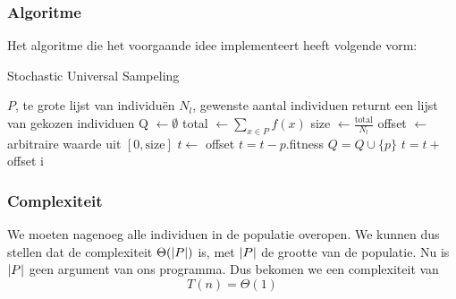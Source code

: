 \subsubsection{Algoritme}
Het algoritme die het voorgaande idee implementeert heeft volgende vorm:
	\begin{algorithm}[H]
	 	\caption{Stochastic Universal Sampeling}
		\begin{algorithmic}
		\Require 
			\State $P$, te grote lijst van individuën 
			\State $N_l$, gewenste aantal individuen
		\Ensure returnt een lijst van gekozen individuen
		\State Q $\gets \emptyset$
		\State total $\gets \sum_{x \in P} f(x)$ 
		\State size $\gets \frac{\text{total}}{N_l}$
		\State offset $\gets$ arbitraire waarde uit $\left\lbrack 0,\text{size} \right\rbrack$
		\State $t \gets$ offset
		\State $t = t-p.$fitness
			\State $Q = Q \cup \lbrace p \rbrace$
			\State $t = t+$offset
		\EndIf
		\EndFor		
		\State \Return i
		\EndFunction

		
		\end{algorithmic}
		\label{alg:SUS}
	\end{algorithm}		

\subsubsection{Complexiteit}
\label{ssub:SUSComplexity}
We moeten nagenoeg alle individuen in de populatie overopen. We kunnen dus stellen dat de complexiteit $ \Theta(\lvert P \rvert)$ is, met $\lvert P \rvert$ de grootte van de populatie. Nu is $\lvert P \rvert$ geen argument van ons programma. Dus bekomen we een complexiteit van \[T(n) = \Theta(1)\]

%